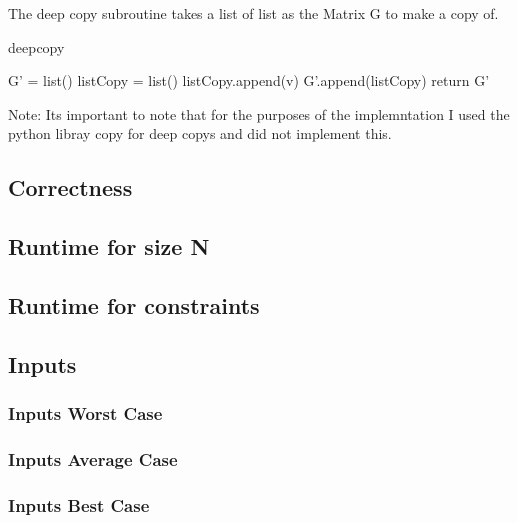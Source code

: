 \documentclass{sig-alternate}
\begin{document}
The deep copy subroutine takes a list of list as the Matrix G to make a copy of. 

\begin{algorithm}
\caption{deepcopy}\label{deepcopy}
\begin{algorithmic}[1]

\State G' = list()
\State listCopy = list()
\State listCopy.append(v)
\EndFor
\State G'.append(listCopy)
\EndFor
\State return G'
\EndProcedure
\end{algorithmic}
\end{algorithm}

Note: Its important to note that for the purposes of the implemntation I used the python libray copy for deep copys and did not implement this.


\subsection{Correctness}

\subsection{Runtime for size N}

\subsection{Runtime for constraints}

\subsection{Inputs} 

\subsubsection{Inputs Worst Case}
\subsubsection{Inputs Average Case}
\subsubsection{Inputs Best Case}
\end{document}

